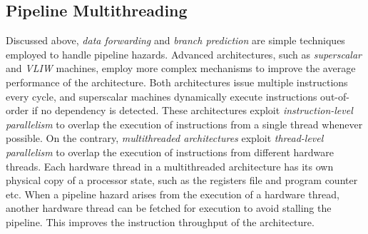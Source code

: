 \subsection{Pipeline Multithreading}
Discussed above, \emph{data forwarding} and \emph{branch prediction} are simple techniques employed to handle pipeline hazards. 
Advanced architectures, such as \emph{superscalar} and \emph{VLIW} machines, employ more complex mechanisms to improve the average performance of the architecture.  
Both architectures issue multiple instructions every cycle, and superscalar machines dynamically execute instructions out-of-order if no dependency is detected.    
These architectures exploit \emph{instruction-level parallelism} to overlap the execution of instructions from a single thread whenever possible.         
On the contrary, \emph{multithreaded architectures} exploit \emph{thread-level parallelism} to overlap the execution of instructions from different hardware threads. 
Each hardware thread in a multithreaded architecture has its own physical copy of a processor state, such as the registers file and program counter etc.
When a pipeline hazard arises from the execution of a hardware thread, another hardware thread can be fetched for execution to avoid stalling the pipeline. 
This improves the instruction throughput of the architecture.


